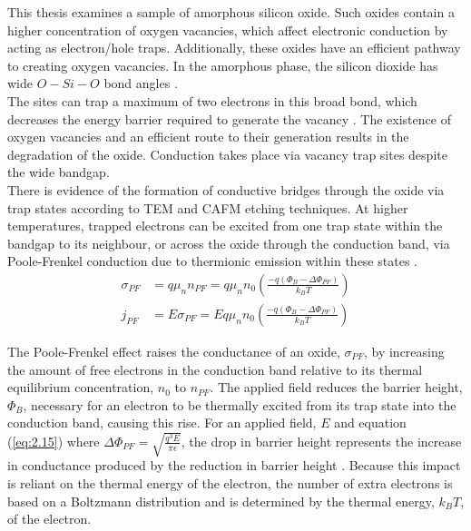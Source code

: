 \noindent This thesis examines a sample of amorphous silicon oxide. Such oxides contain a higher concentration of oxygen vacancies, which affect electronic conduction by acting as electron/hole traps. Additionally, these oxides have an efficient pathway to creating oxygen vacancies. In the amorphous phase, the silicon dioxide has wide $O-Si-O$ bond angles \cite{el2013identification}.\\

\noindent The sites can trap a maximum of two electrons in this broad bond, which decreases the energy barrier required to generate the vacancy \cite{gao2016mechanism}. The existence of oxygen vacancies and an efficient route to their generation results in the degradation of the oxide. Conduction takes place via vacancy trap sites despite the wide bandgap. \\

\noindent There is evidence of the formation of conductive bridges through the oxide via trap states according to TEM \cite{munde2017intrinsic, wu2015evolution} and CAFM \cite{buckwell2015conductance} etching techniques. At higher temperatures, trapped electrons can be excited from one trap state within the bandgap to its neighbour, or across the oxide through the conduction band, via Poole-Frenkel conduction due to thermionic emission within these states \cite{frenkel1938pre}.
\begin{align}
    \sigma_{PF} &= q \mu_n n_{PF} = q \mu_n n_0 \left( \frac{-q (\Phi_B - \Delta\Phi_{PF}) }{k_B T} \right) \label{eq:4.14} \\
    j_{PF} &= E \sigma_{PF} = E q \mu_n n_0 \left( \frac{-q (\Phi_B - \Delta\Phi_{PF}) }{k_B T} \right) \label{eq:4.15}
\end{align}


\noindent The Poole-Frenkel effect raises the conductance of an oxide, $\sigma_{PF}$, by increasing the amount of free electrons in the conduction band relative to its thermal equilibrium concentration, $n_0$ to $n_{PF}$. The applied field reduces the barrier height, $\Phi_B$, necessary for an electron to be thermally excited from its trap state into the conduction band, causing this rise. For an applied field, $E$ and equation (\ref{eq:2.15}) where $\Delta \Phi_{PF} = \sqrt{\frac{q^3 E}{\pi \epsilon}}$, the drop in barrier height represents the increase in conductance produced by the reduction in barrier height \cite{sze2021physics}. Because this impact is reliant on the thermal energy of the electron, the number of extra electrons is based on a Boltzmann distribution and is determined by the thermal energy, $k_B T$, of the electron. \\

